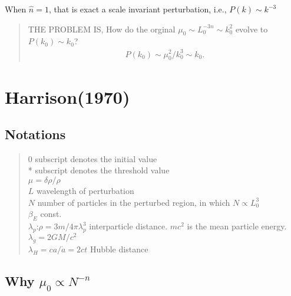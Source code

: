 When $\hat{n}=1$, that is exact a scale invariant perturbation, i.e., $P(k)\sim k^{-3}$


\begin{quote}
THE PROBLEM IS, How do the orginal $\mu_0\sim L_0^{-3n}\sim k_0^2$ evolve to $P(k_0)\sim k_0$?
\begin{eqnarray}
P(k_0)\sim \mu_0^2/k_0^3 \sim k_0.
\end{eqnarray}
\end{quote}




















\iffalse


\section{Harrison(1970)}



\setcounter{section}{0}


\subsection{Notations} 

\begin{quote}
0 subscript denotes the initial value \\
* subscript denotes the threshold value \\
$\mu=\delta\rho/\rho$ \\
$L$ wavelength of perturbation  \\
$N$  number of particles in the perturbed region, in which $N\propto L_0^3$  \\
$\beta_E$ const. \\
$\lambda_p$:$\rho=3m/4\pi\lambda_p^3$ interparticle distance. $mc^2$ is the mean particle energy. \\
$\lambda_g=2GM/c^2$   \\
$\lambda_H=ca/\dot a=2ct$  Hubble distance
\end{quote}



\subsection{Why $\mu_0\propto N^{-n}$}

